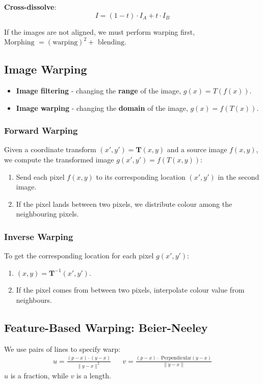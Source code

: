 \documentclass[11pt]{article}
\begin{document}
\textbf{Cross-dissolve}:
\[
  I = (1 - t) \cdot I_A + t\cdot I_B 
\]

If the images are not aligned, we must perform warping first, $\text{Morphing } = (\text{warping})^2 + \text{ blending}$.

\subsection{Image Warping}
\begin{itemize}
  \item \textbf{Image filtering} - changing the \textbf{range} of the image, $g(x) = T(f(x))$.
  \item \textbf{Image warping} - changing the \textbf{domain} of the image, $g(x) = f(T(x))$.
\end{itemize}

\subsubsection{Forward Warping}
Given a coordinate transform $(x', y') = \bm{T}(x, y)$ and a source image $f(x,y)$, we compute the transformed image $g(x', y') = f(T(x, y))$:
\begin{enumerate}
  \item Send each pixel $f(x, y)$ to its corresponding location $(x', y')$ in the second image.
  \item If the pixel lands between two pixels, we distribute colour among the neighbouring pixels.
\end{enumerate}

\subsubsection{Inverse Warping}
To get the corresponding location for each pixel $g(x', y')$:
\begin{enumerate}
  \item $(x, y) = \bm{T}^{-1}(x', y')$.
  \item If the pixel comes from between two pixels, interpolate colour value from neighbours.
\end{enumerate}

\subsection{Feature-Based Warping: Beier-Neeley}
We use pairs of lines to specify warp:
\begin{align*}
  u = \frac{(p-x)\cdot(y-x)}{\lVert y - x \rVert^2} &&
  v = \frac{(p-x)\cdot\text{ Perpendicular}(y - x)}{\lVert y - x \rVert}
\end{align*}
$u$ is a fraction, while $v$ is a length.
\end{document}

